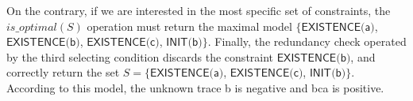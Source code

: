 On the contrary, if we are interested in the most specific set of constraints, the ${is\_optimal}(S)$ operation must return the maximal model $\{\textsf{EXISTENCE(a)}$, $\textsf{EXISTENCE(b)}$, $\textsf{EXISTENCE(c)}$, $\textsf{INIT(b)}\}$. Finally, the redundancy check operated by the third selecting condition discards the constraint $\textsf{EXISTENCE(b)}$, and correctly return the set $S=$$\{\textsf{EXISTENCE(a)}$, $\textsf{EXISTENCE(c)}$, $\textsf{INIT(b)}\}$. According to this model, the unknown trace \textsf{b} is negative and \textsf{bca} is positive. 


%
%
%
%


